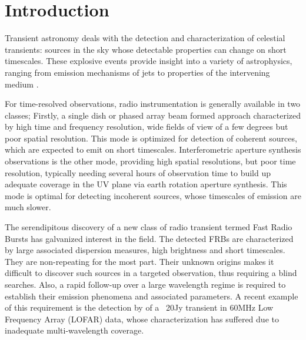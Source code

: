 \documentclass{ws-jai}
\begin{document}

\section{\label{sec:Introduction}Introduction}

\noindent Transient astronomy  deals with the detection  and characterization of
celestial transients: sources in the  sky whose detectable properties can change
on short timescales.   These explosive events provide insight into  a variety of
astrophysics,  ranging from  emission mechanisms  of jets  to properties  of the
intervening  medium \citep{fender2006lofar,lazio2009dynamic,cordes2004dynamic}.  


For time-resolved observations, radio  instrumentation is generally available in
two  classes; Firstly,  a  single  dish or  phased  array  beam formed  approach
characterized by  high time and frequency  resolution, wide fields of  view of a
few degrees but poor spatial resolution. This mode is optimized for detection of
coherent    sources,     which    are     expected    to    emit     on    short
timescales. Interferometric  aperture synthesis observations is  the other mode,
providing high spatial resolutions, but  poor time resolution, typically needing
several hours of observation time to build  up adequate coverage in the UV plane
via  earth rotation  aperture synthesis.   This  mode is  optimal for  detecting
incoherent  sources,  whose  timescales  of   emission  are  much  slower.

The serendipitous discovery of a new  class of radio transient termed Fast Radio
Bursts  \citep[FRBs;][]{spitler2015fast, thornton2013population}  has galvanized
interest in the field.  The detected  FRBs are characterized by large associated
dispersion   measures,  high   brightness  and   short  timescales.    They  are
non-repeating for  the most part.  Their  unknown origins makes it  difficult to
discover  such  sources  in  a  targeted observation,  thus  requiring  a  blind
searches. Also, a rapid follow-up over  a large wavelength regime is required to
establish their emission phenomena and  associated parameters.  A recent example
of  this requirement  is the  detection by  \citet{stewart2016lofar} of  a ~20Jy
transient in 60MHz Low Frequency  Array (LOFAR) data, whose characterization has
suffered due to inadequate multi-wavelength coverage.
\end{document}
